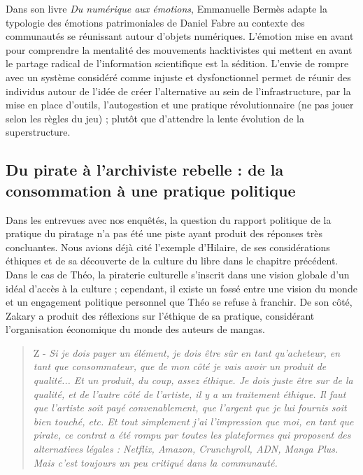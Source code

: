 Dans son livre \textit{Du numérique aux émotions}, Emmanuelle Bermès adapte la typologie des émotions patrimoniales de Daniel Fabre au contexte des communautés se réunissant autour d'objets numériques. L'émotion mise en avant pour comprendre la mentalité des mouvements \og hacktivistes \fg qui mettent en avant le partage radical de l'information scientifique est la sédition. L'envie de rompre avec un système considéré comme injuste et dysfonctionnel permet de réunir des individus autour de l'idée de créer l'alternative au sein de l'infrastructure, par la mise en place d'outils, l'autogestion et une pratique révolutionnaire (ne pas jouer selon les règles du jeu) ; plutôt que d'attendre la lente évolution de la superstructure.

\subsection*{Du pirate à l'archiviste rebelle : de la consommation à une pratique politique}

Dans les entrevues avec nos enquêtés, la question du rapport politique de la pratique du piratage n'a pas été une piste ayant produit des réponses très concluantes. Nous avions déjà cité l'exemple d'Hilaire, de ses considérations éthiques et de sa découverte de la culture du libre dans le chapitre précédent. Dans le cas de Théo, la piraterie culturelle s'inscrit dans une vision globale d'un idéal d'accès à la culture ; cependant, il existe un fossé entre une vision du monde et un engagement politique personnel que Théo se refuse à franchir. De son côté, Zakary a produit des réflexions sur l'éthique de sa pratique, considérant l'organisation économique du monde des auteurs de mangas. 

\begin{quote}
    Z - \textit{Si je dois payer un élément, je dois être sûr en tant qu'acheteur, en tant que consommateur, que de mon côté je vais avoir un produit de qualité... Et un produit, du coup, assez éthique. Je dois juste être sur de la qualité, et de l'autre côté de l'artiste, il y a un traitement éthique. Il faut que l'artiste soit payé convenablement, que l'argent que je lui fournis soit bien touché, etc. Et tout simplement j'ai l'impression que moi, en tant que pirate, ce contrat a été rompu par toutes les plateformes qui proposent des alternatives légales : Netflix, Amazon, Crunchyroll, ADN, Manga Plus. Mais c'est toujours un peu critiqué dans la communauté.}
\end{quote}

